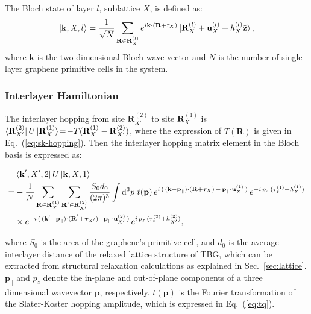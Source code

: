 \documentclass[aps,prx,10pt,twocolumn,superscriptaddress]{revtex4}
\begin{document}
The Bloch state of layer $l$, sublattice $X$, is defined as:
\begin{equation}
\ket{\textbf{k},X,l}=\frac{1}{\sqrt{N}}\sum_{\textbf{R}\in\textbf{R}^{(l)}_{X}}e^{i\textbf{k}\cdot(\textbf{R}+\mathbf{\tau}_{X})}\ket{\textbf{R}^{(l)}_X+\textbf{u}^{(l)}_{X}+h^{(l)}_{X}\hat{\mathbf{z}}},
\end{equation} 
where $\textbf{k}$ is the two-dimensional Bloch wave vector and $N$ is the number of single-layer graphene primitive cells in the system.


\subsubsection{Interlayer Hamiltonian}
The interlayer hopping from site $\textbf{R}^{(2)}_{X'}$ to site $\textbf{R}^{(1)}_{X}$ is $\bra{\textbf{R}^{(2)}_{X'}} U\ket{\textbf{R}^{(1)}_X}\!=\!-T(\textbf{R}^{(1)}_X-\textbf{R}^{(2)}_{X'})$, where the expression of $T(\textbf{R})$ is given in Eq.~(\ref{eq:sk-hopping}). Then the interlayer hopping matrix element in the Bloch basis is expressed as:
\begin{widetext}
\begin{equation}
\begin{split}
&\bra{\textbf{k}',X',2}U\ket{\textbf{k},X,1}\;\\
=&-\frac{1}{N}\sum_{\textbf{R}\in\textbf{R}^{(1)}_{X}}\sum_{\textbf{R}'\in\textbf{R}^{(2)}_{X'}}\frac{S_{0}d_{0}}{(2\pi)^{3}}\int\mathrm{d}^{3}p\ t(\textbf{p})\,e^{i\,(\,(\textbf{k}-\textbf{p}_{\parallel})\cdot(\textbf{R}+\bm{\tau}_{X})\,-\,\textbf{p}_{\parallel}\cdot\textbf{u}^{(1)}_{X}\,)}\,e^{-i\, p_{z}\,(\tau^{(1)}_z+h^{(1)}_{X})}\\
&\times e^{-i\,(\,(\textbf{k}'-\textbf{p}_{\parallel})\cdot(\textbf{R}^{'}+\bm{\tau}_{X'})-\textbf{p}_{\parallel}\cdot\textbf{u}^{(2)}_{X'}\,)}\,e^{i\, p_{z}\,(\tau^{(2)}_z+h^{(2)}_{X'})},
\end{split}
\label{eq:hopping-bloch}
\end{equation}
\end{widetext}
where $S_{0}$ is the area of the  graphene's primitive cell, and $d_{0}$ is the average interlayer distance of the relaxed lattice structure of TBG, which can be extracted from structural relaxation calculations as explained in Sec.~\ref{sec:lattice}. $\textbf{p}_{\parallel}$ and $p_z$ denote the in-plane and out-of-plane  components of a three dimensional wavevector $\textbf{p}$, respectively. $t(\textbf{p})$ is the Fourier transformation of the Slater-Koster hopping amplitude, which is expressed in Eq.~(\ref{eq:tq}). 
\end{document}
